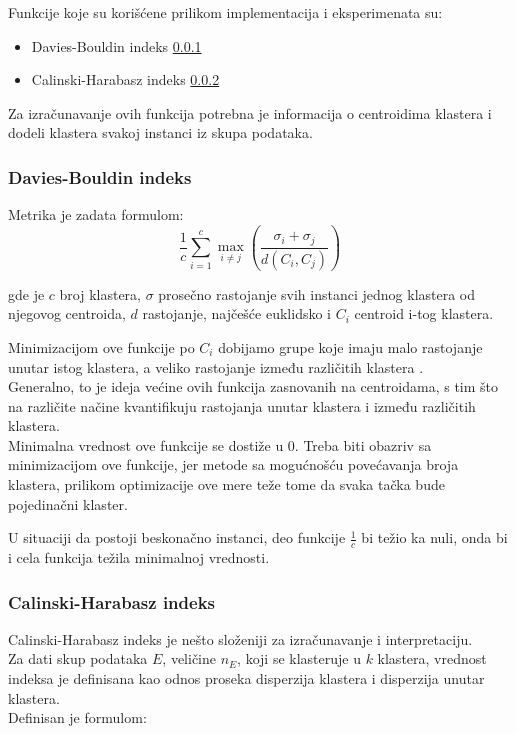 \documentclass[a4paper, twocolumn]{article}
\begin{document}
{Funkcije koje su korišćene prilikom implementacija i eksperimenata su:
\begin{itemize}
	\item Davies-Bouldin indeks \ref{sec:db}
	\item Calinski-Harabasz indeks \ref{sec:ch}
\end{itemize}

Za izračunavanje ovih funkcija potrebna je informacija o centroidima klastera i dodeli klastera svakoj instanci iz skupa podataka.   

\subsubsection{Davies-Bouldin indeks}
\label{sec:db}
Metrika je zadata formulom:
\[ \frac{1}{c}\sum_{i=1}^{c}\max_{i \neq j} \left( \frac{\sigma_i + \sigma_j}{d(C_i, C_j)} \right) \]

gde je $c$ broj klastera, $\sigma$ prosečno rastojanje svih instanci jednog klastera od njegovog centroida, $d$ rastojanje, najčešće euklidsko i $C_i$ centroid i-tog klastera.

Minimizacijom ove funkcije po $C_i$ dobijamo grupe koje imaju malo rastojanje unutar istog klastera, a veliko rastojanje između različitih klastera \cite{db_index}.\\ 

Generalno, to je ideja većine ovih funkcija zasnovanih na centroidama, s tim što na različite načine kvantifikuju rastojanja unutar klastera i između različitih klastera. \\

Minimalna vrednost ove funkcije se dostiže u 0. Treba biti obazriv sa minimizacijom ove funkcije, jer metode sa mogućnošću povećavanja broja klastera, prilikom optimizacije ove mere teže tome da svaka tačka bude pojedinačni klaster.

U situaciji da postoji beskonačno instanci, deo funkcije $\frac{1}{c}$ bi težio ka nuli, onda bi i cela funkcija težila minimalnoj vrednosti.

\subsubsection{Calinski-Harabasz indeks}
\label{sec:ch}
Calinski-Harabasz indeks je nešto složeniji za izračunavanje i interpretaciju.\\
Za dati skup podataka $E$, veličine $n_E$, koji se klasteruje u $k$ klastera, vrednost indeksa je definisana kao odnos proseka disperzija klastera i disperzija unutar klastera.\\
Definisan je formulom:

}
\end{document}
